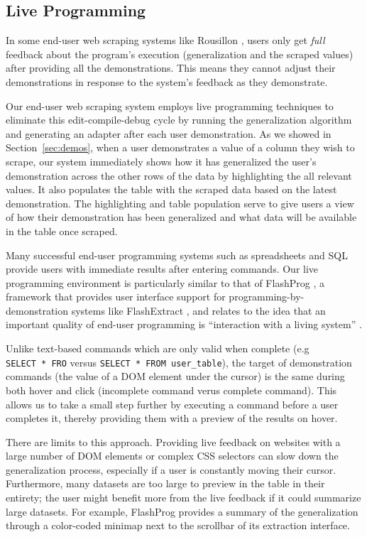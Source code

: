 \documentclass[sigconf,10pt]{acmart}
\begin{document}
\hypertarget{live-programming-1}{%
\subsection{Live Programming}\label{live-programming-1}}

In some end-user web scraping systems like Rousillon
\citep{chasins2018}, users only get \emph{full} feedback about the
program's execution (generalization and the scraped values) after
providing all the demonstrations. This means they cannot adjust their
demonstrations in response to the system's feedback as they demonstrate.

Our end-user web scraping system employs live programming techniques to
eliminate this edit-compile-debug cycle by running the generalization
algorithm and generating an adapter after each user demonstration. As we
showed in Section~\ref{sec:demos}, when a user demonstrates a value of a
column they wish to scrape, our system immediately shows how it has
generalized the user's demonstration across the other rows of the data
by highlighting the all relevant values. It also populates the table
with the scraped data based on the latest demonstration. The
highlighting and table population serve to give users a view of how
their demonstration has been generalized and what data will be available
in the table once scraped.

Many successful end-user programming systems such as spreadsheets and
SQL provide users with immediate results after entering commands. Our
live programming environment is particularly similar to that of
FlashProg \citep{mayer2015}, a framework that provides user interface
support for programming-by-demonstration systems like FlashExtract
\citep{le2014}, and relates to the idea that an important quality of
end-user programming is ``interaction with a living system''
\citep{zotero-60}.

Unlike text-based commands which are only valid when complete (e.g
\texttt{SELECT\ *\ FRO} versus \texttt{SELECT\ *\ FROM\ user\_table}),
the target of demonstration commands (the value of a DOM element under
the cursor) is the same during both hover and click (incomplete command
verus complete command). This allows us to take a small step further by
executing a command before a user completes it, thereby providing them
with a preview of the results on hover.

There are limits to this approach. Providing live feedback on websites
with a large number of DOM elements or complex CSS selectors can slow
down the generalization process, especially if a user is constantly
moving their cursor. Furthermore, many datasets are too large to preview
in the table in their entirety; the user might benefit more from the
live feedback if it could summarize large datasets. For example,
FlashProg provides a summary of the generalization through a color-coded
minimap next to the scrollbar of its extraction interface.
\end{document}
